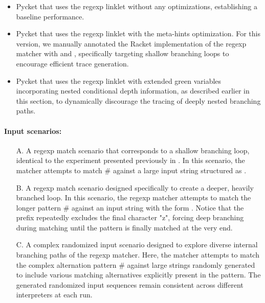    \begin{itemize}
      \item Pycket that uses the regexp linklet without any optimizations, establishing a baseline performance.
      \item Pycket that uses the regexp linklet with the meta-hints optimization. For this version, we manually annotated the Racket implementation of the regexp matcher with  and , specifically targeting shallow branching loops to encourage efficient trace generation.
      \item Pycket that uses the regexp linklet with extended green variables incorporating nested conditional depth information, as described earlier in this section, to dynamically discourage the tracing of deeply nested branching paths.
    \end{itemize}

    \paragraph{Input scenarios:}

    \begin{itemize}
      \item[A.] A regexp match scenario that corresponds to a shallow branching loop, identical to the experiment presented previously in . In this scenario, the matcher attempts to match $\mathtt{\#}$ against a large input string structured as .
      \item[B.] A regexp match scenario designed specifically to create a deeper, heavily branched loop. In this scenario, the regexp matcher attempts to match the longer pattern $\mathtt{\#}$ against an input string with the form . Notice that the prefix repeatedly excludes the final character "z", forcing deep branching during matching until the pattern is finally matched at the very end.
      \item[C.] A complex randomized input scenario designed to explore diverse internal branching paths of the regexp matcher. Here, the matcher attempts to match the complex alternation pattern $\mathtt{\#}$ against large strings randomly generated to include various matching alternatives explicitly present in the pattern. The generated randomized input sequences remain consistent across different interpreters at each run.
    \end{itemize}

